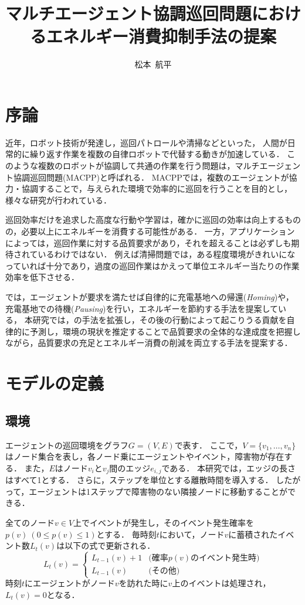 \documentclass[11pt,a4j,twocolumn]{jarticle}
\title{マルチエージェント協調巡回問題におけるエネルギー消費抑制手法の提案}
\author{松本~航平}
\begin{document}
\maketitle
\section{序論}
近年，ロボット技術が発達し，巡回パトロールや清掃などといった，
人間が日常的に繰り返す作業を複数の自律ロボットで代替する動きが加速している．
このような複数のロボットが協調して共通の作業を行う問題は，マルチエージェント協調巡回問題(MACPP)と呼ばれる．
MACPPでは，複数のエージェントが協力・協調することで，与えられた環境で効率的に巡回を行うことを目的とし，様々な研究が行われている\cite{Yoneda2013,Wu2019}．
\par

巡回効率だけを追求した高度な行動や学習は，確かに巡回の効率は向上するものの，必要以上にエネルギーを消費する可能性がある．
一方，アプリケーションによっては，巡回作業に対する品質要求があり，それを超えることは必ずしも期待されているわけではない．
例えば清掃問題では，ある程度環境がきれいになっていれば十分であり，過度の巡回作業はかえって単位エネルギー当たりの作業効率を低下させる．
\par

\cite{Wu2019}では，エージェントが要求を満たせば自律的に充電基地への帰還({\em Homing})や，充電基地での待機({\em Pausing})を行い，エネルギーを節約する手法を提案している，
本研究では，\cite{Wu2019}の手法を拡張し，その後の行動によって起こりうる貢献を自律的に予測し，環境の現状を推定することで品質要求の全体的な達成度を把握しながら，品質要求の充足とエネルギー消費の削減を両立する手法を提案する．

\section{モデルの定義}
\subsection{環境}
エージェントの巡回環境をグラフ$G = (V,E)$で表す．
ここで，$V = \{v_1, \dots, v_n \}$はノード集合を表し，各ノード乗にエージェントやイベント，障害物が存在する．
また，$E$はノード$v_i$と$v_j$間のエッジ$e_{i,j}$である．
本研究では，エッジの長さはすべて1とする．
さらに，ステップを単位とする離散時間を導入する．
したがって，エージェントは1ステップで障害物のない隣接ノードに移動することができる．
\par

全てのノード$v\in V$上でイベントが発生し，そのイベント発生確率を$p(v)~(0\leq p(v)\leq 1)$とする．
毎時刻$t$において，ノード$v$に蓄積されたイベント数$L_t(v)$は以下の式で更新される．
%
\[
  L_t(v) = \left\{
\begin{array}{ll}
  L_{t-1}(v) + 1 & \textrm{(確率$p(v)$のイベント発生時)} \\
  L_{t-1}(v) & \textrm{(その他)}
\end{array}
\right.  
\]
%
時刻$t$にエージェントがノード$v$を訪れた時に$v$上のイベントは処理され，$L_t(v) = 0$となる．
\end{document}
